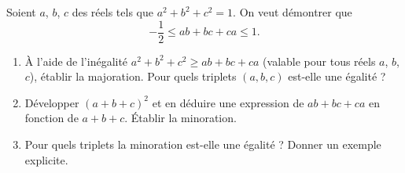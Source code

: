 Soient $a$, $b$, $c$ des réels tels que $a^2 + b^2 + c^2 = 1$. On veut
démontrer que
\[
-\frac12 \leqslant ab + bc + ca \leqslant 1.
\]
\begin{enumerate}
  \item À l'aide de l'inégalité $a^2 + b^2 + c^2 \geqslant ab + bc + ca$
  (valable pour tous réels $a$, $b$, $c$), établir la majoration. Pour quels
  triplets $(a, b, c)$ est-elle une égalité ?
  \item Développer $(a+b+c)^2$ et en déduire une expression de
  $ab + bc + ca$ en fonction de $a + b + c$. Établir la minoration.
  \item Pour quels triplets la minoration est-elle une égalité ? Donner un
  exemple explicite.
\end{enumerate}
